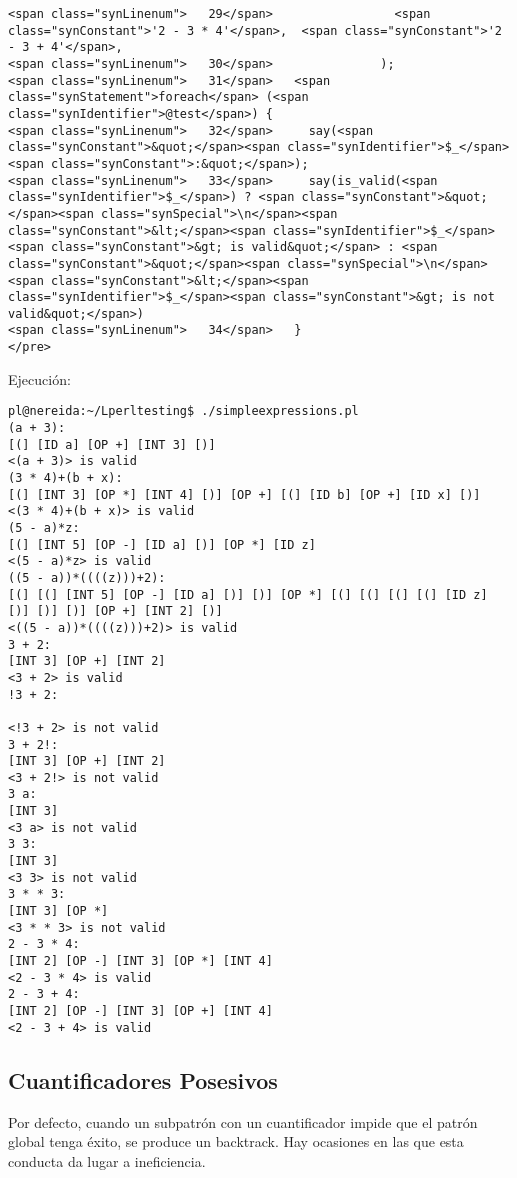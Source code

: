 \begin{verbatim}
<span class="synLinenum">   29</span>                 <span class="synConstant">'2 - 3 * 4'</span>,  <span class="synConstant">'2 - 3 + 4'</span>,
<span class="synLinenum">   30</span>               );
<span class="synLinenum">   31</span>   <span class="synStatement">foreach</span> (<span class="synIdentifier">@test</span>) {
<span class="synLinenum">   32</span>     say(<span class="synConstant">&quot;</span><span class="synIdentifier">$_</span><span class="synConstant">:&quot;</span>);
<span class="synLinenum">   33</span>     say(is_valid(<span class="synIdentifier">$_</span>) ? <span class="synConstant">&quot;</span><span class="synSpecial">\n</span><span class="synConstant">&lt;</span><span class="synIdentifier">$_</span><span class="synConstant">&gt; is valid&quot;</span> : <span class="synConstant">&quot;</span><span class="synSpecial">\n</span><span class="synConstant">&lt;</span><span class="synIdentifier">$_</span><span class="synConstant">&gt; is not valid&quot;</span>)
<span class="synLinenum">   34</span>   }
</pre>

\end{verbatim}

Ejecución:

\begin{verbatim}
pl@nereida:~/Lperltesting$ ./simpleexpressions.pl
(a + 3):
[(] [ID a] [OP +] [INT 3] [)]
<(a + 3)> is valid
(3 * 4)+(b + x):
[(] [INT 3] [OP *] [INT 4] [)] [OP +] [(] [ID b] [OP +] [ID x] [)]
<(3 * 4)+(b + x)> is valid
(5 - a)*z:
[(] [INT 5] [OP -] [ID a] [)] [OP *] [ID z]
<(5 - a)*z> is valid
((5 - a))*((((z)))+2):
[(] [(] [INT 5] [OP -] [ID a] [)] [)] [OP *] [(] [(] [(] [(] [ID z] [)] [)] [)] [OP +] [INT 2] [)]
<((5 - a))*((((z)))+2)> is valid
3 + 2:
[INT 3] [OP +] [INT 2]
<3 + 2> is valid
!3 + 2:

<!3 + 2> is not valid
3 + 2!:
[INT 3] [OP +] [INT 2]
<3 + 2!> is not valid
3 a:
[INT 3]
<3 a> is not valid
3 3:
[INT 3]
<3 3> is not valid
3 * * 3:
[INT 3] [OP *]
<3 * * 3> is not valid
2 - 3 * 4:
[INT 2] [OP -] [INT 3] [OP *] [INT 4]
<2 - 3 * 4> is valid
2 - 3 + 4:
[INT 2] [OP -] [INT 3] [OP +] [INT 4]
<2 - 3 + 4> is valid
\end{verbatim}

\subsection{Cuantificadores Posesivos}
\label{subsection:cuantificadoresposesivos}

Por defecto, cuando un subpatrón con un cuantificador impide que 
el patrón global tenga éxito, se produce un backtrack.
Hay ocasiones en las que esta conducta 
da lugar a ineficiencia.

